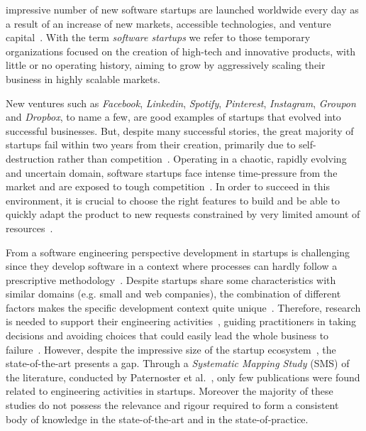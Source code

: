 \documentclass[10pt,journal,letterpaper,compsoc]{IEEEtran}
\begin{document}
%
%
%
%
 impressive number of new software startups are launched
worldwide every day as a result of an increase of new markets, accessible
technologies, and venture capital~\cite{8491286}. With the term
\textit{software startups} we refer to those temporary organizations focused on
the creation of high-tech and innovative products, with little or no operating
history, aiming to grow by aggressively scaling their business in highly
scalable markets.

New ventures such as \textit{Facebook}, \textit{Linkedin}, \textit{Spotify},
\textit{Pinterest}, \textit{Instagram}, \textit{Groupon} and \textit{Dropbox},
to name a few, are good examples of startups that evolved into successful
businesses. But, despite many successful stories, the great majority of startups
fail within two years from their creation, primarily due to self-destruction
rather than competition~\cite{Crowne2002}. Operating in a chaotic, rapidly
evolving and uncertain domain, software startups face intense time-pressure from
the market and are exposed to tough competition~\cite{Maccormack2001,
Eisenhardt1998}. In order to succeed in this environment, it is crucial to
choose the right features to build and be able to quickly adapt the product to
new requests constrained by very limited amount of resources~\cite{Sutton2000}.

From a software engineering perspective development in startups is challenging
since they develop software in a context where processes can hardly follow a
prescriptive methodology~\cite{Sutton2000, Coleman2005}. Despite startups share
some characteristics with similar domains (e.g. small and web companies), the
combination of different factors makes the specific development context quite
unique~\cite{Blank2005, Sutton2000}. Therefore, research is needed to support
their engineering activities~\cite{Coleman2005}, guiding practitioners in taking
decisions and avoiding choices that could easily lead the whole business to
failure~\cite{Kajko-Mattsson2008}. However, despite the impressive size of the
startup ecosystem~\cite{ISI:000243253000007}, the state-of-the-art presents a
gap. Through a \textit{Systematic Mapping Study} (SMS) of the literature,
conducted by Paternoster et al.~\cite{SMS}, only few publications were found
related to engineering activities in startups. Moreover the majority of these
studies do not possess the relevance and rigour required to form a consistent
body of knowledge in the state-of-the-art and in the state-of-practice.
\end{document}
